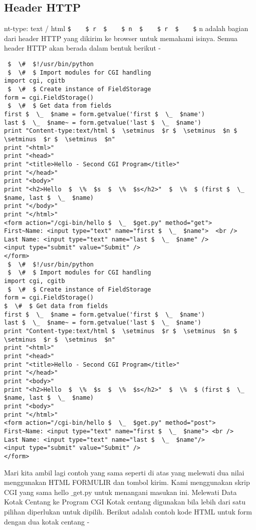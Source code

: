 \begin{enumerate}
\begin{enumerate}
\subsection{Header HTTP}
nt-type: text / html  \verb|$    $ r  $    $ n  $    $ r  $    $| n adalah bagian dari header HTTP yang dikirim ke browser untuk memahami isinya. Semua header HTTP akan berada dalam bentuk berikut -
\begin{verbatim}
 $  \#  $!/usr/bin/python
 $  \#  $ Import modules for CGI handling
import cgi, cgitb
 $  \#  $ Create instance of FieldStorage
form = cgi.FieldStorage()
 $  \#  $ Get data from fields
first $  \_  $name = form.getvalue('first $  \_  $name')
last $  \_  $name~ = form.getvalue('last $  \_  $name')
print "Content-type:text/html $  \setminus  $r $  \setminus  $n $  \setminus  $r $  \setminus  $n"
print "<html>"
print "<head>"
print "<title>Hello - Second CGI Program</title>"
print "</head>"
print "<body>"
print "<h2>Hello  $  \%  $s  $  \%  $s</h2>"  $  \%  $ (first $  \_  $name, last $  \_  $name)
print "</body>"
print "</html>"
<form action="/cgi-bin/hello $  \_  $get.py" method="get">
First~Name: <input type="text" name="first $  \_  $name">  <br />
Last Name: <input type="text" name="last $  \_  $name" />
<input type="submit" value="Submit" />
</form>
 $  \#  $!/usr/bin/python
 $  \#  $ Import modules for CGI handling
import cgi, cgitb
 $  \#  $ Create instance of FieldStorage
form = cgi.FieldStorage()
$  \#  $ Get data from fields
first $  \_  $name = form.getvalue('first $  \_  $name')
last $  \_  $name~ = form.getvalue('last $  \_  $name')
print "Content-type:text/html $  \setminus  $r $  \setminus  $n $  \setminus  $r $  \setminus  $n"
print "<html>"
print "<head>"
print "<title>Hello - Second CGI Program</title>"
print "</head>"
print "<body>"
print "<h2>Hello  $  \%  $s  $  \%  $s</h2>"  $  \%  $ (first $  \_  $name, last $  \_  $name)
print "<body>"
print "</html>"
<form action="/cgi-bin/hello $  \_  $get.py" method="post">
First~Name: <input type="text" name="first $  \_  $name"> <br />
Last Name: <input type="text" name="last $  \_  $name"/>
<input type="submit" value="Submit" />
</form>
\end{verbatim}
Mari kita ambil lagi contoh yang sama seperti di atas yang melewati dua nilai menggunakan HTML FORMULIR dan tombol kirim. Kami menggunakan skrip CGI yang sama hello $  \_  $get.py untuk menangani masukan ini.
Melewati Data Kotak Centang ke Program CGI
Kotak centang digunakan bila lebih dari satu pilihan diperlukan untuk dipilih.
Berikut adalah contoh kode HTML untuk form dengan dua kotak centang -

\end{enumerate}
\end{enumerate}
